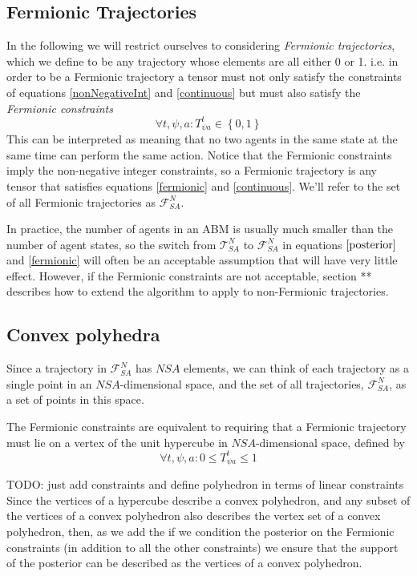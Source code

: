 \documentclass{article}
\begin{document}
\subsection{Fermionic Trajectories}

In the following we will restrict ourselves to considering \textit{Fermionic trajectories}, which we define to be any trajectory whose elements are all either 0 or 1. i.e. in order to be a Fermionic trajectory a tensor must not only satisfy the constraints of equations \ref{nonNegativeInt} and \ref{continuous} but must also satisfy the \textit{Fermionic constraints}
\begin{equation}
\forall t,\psi,a: T^t_{\psi a} \in \left\{ 0,1 \right\}
\label{fermionic}
\end{equation}
This can be interpreted as meaning that no two agents in the same state at the same time can perform the same action. Notice that the Fermionic constraints imply the non-negative integer constraints, so a Fermionic trajectory is any tensor that satisfies equations \ref{fermionic} and \ref{continuous}. We'll refer to the set of all Fermionic trajectories as $\mathcal{F}^N_{SA}$.

In practice, the number of agents in an ABM is usually much smaller than the number of agent states, so the switch from $\mathcal{T}^N_{SA}$ to $\mathcal{F}^N_{SA}$ in equations $\ref{posterior}$ and \ref{fermionic} will often be an acceptable assumption that will have very little effect. However, if the Fermionic constraints are not acceptable, section ** describes how to extend the algorithm to apply to non-Fermionic trajectories.

\subsection{Convex polyhedra}

Since a trajectory in $\mathcal{F}^N_{SA}$ has $NSA$ elements, we can think of each trajectory as a single point in an $NSA$-dimensional space, and the set of all trajectories, $\mathcal{F}^N_{SA}$, as a set of points in this space.

The Fermionic constraints are equivalent to requiring that a Fermionic trajectory must lie on a vertex of the unit hypercube in $NSA$-dimensional space, defined by
\begin{equation}
\forall t,\psi,a: 0 \le T^t_{\psi a} \le 1
\label{linearfermionic}
\end{equation}


TODO: just add constraints and define polyhedron in terms of linear constraints
Since the vertices of a hypercube describe a convex polyhedron, and any subset of the vertices of a convex polyhedron also describes the vertex set of a convex polyhedron, then, as we add the  if we condition the posterior on the Fermionic constraints (in addition to all the other constraints) we ensure that the support of the posterior can be described as the vertices of a convex polyhedron.
\end{document}

